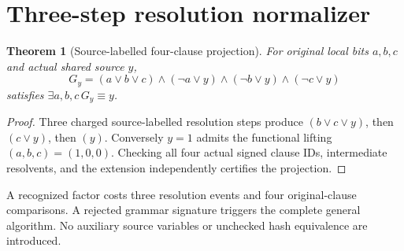 \documentclass[11pt]{article}
\newtheorem{theorem}{Theorem}
\begin{document}
\section{Three-step resolution normalizer}
\begin{theorem}[Source-labelled four-clause projection]
For original local bits $a,b,c$ and actual shared source $y$,
\[
G_y=(a\vee b\vee c)\wedge(\neg a\vee y)
\wedge(\neg b\vee y)\wedge(\neg c\vee y)
\]
satisfies $\exists a,b,c\,G_y\equiv y$.
\end{theorem}
\begin{proof}
Three charged source-labelled resolution steps produce
$(b\vee c\vee y)$, then $(c\vee y)$, then $(y)$.
Conversely $y=1$ admits the functional lifting $(a,b,c)=(1,0,0)$.
Checking all four actual signed clause IDs, intermediate resolvents,
and the extension independently certifies the projection.
\end{proof}
A recognized factor costs three resolution events and four original-clause comparisons. A rejected grammar signature triggers the complete general algorithm. No auxiliary source variables or unchecked hash equivalence are introduced.
\end{document}

